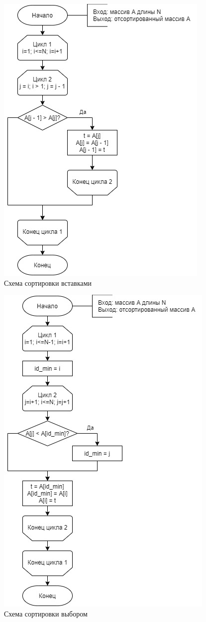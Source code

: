 \documentclass[12pt]{report}
\begin{document}
	\begin{figure}[h]
		\centering
		\includegraphics[scale=0.9]{isort.jpg}
		\caption{Схема сортировки вставками}
		\label{fig:ins}
	\end{figure}
	
	\newpage
	
	\begin{figure}[h]
		\centering
		\includegraphics[scale=0.8]{ssort.jpg}
		\caption{Схема сортировки выбором}
		\label{fig:sel}
	\end{figure}
	
\end{document}

